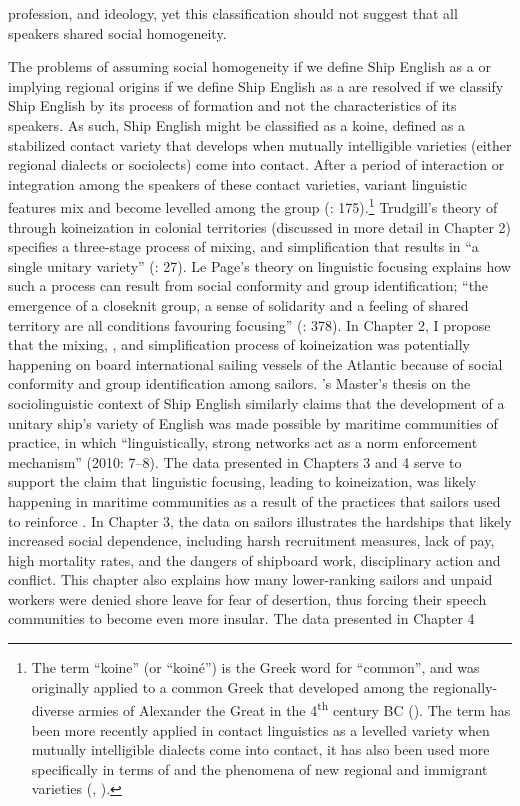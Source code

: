profession, and ideology, yet this classification should not suggest that all speakers shared social homogeneity. 

The problems of assuming social homogeneity if we define Ship English as a  or implying regional origins if we define Ship English as a  are resolved if we classify Ship English by its process of formation and not the characteristics of its speakers. As such, Ship English might be classified as a koine, defined as a stabilized contact variety that develops when mutually intelligible varieties (either regional dialects or sociolects) come into contact. After a period of interaction or integration among the speakers of these contact varieties, variant linguistic features mix and become levelled among the group (\citealt{Siegel2001}: 175).\footnote{The term “koine” (or “koiné”) is the Greek word for “common”, and was originally applied to a common Greek  that developed among the regionally-diverse armies of Alexander the Great in the 4\textsuperscript{th} century BC (\citealt{Andriotis1995}). The term has been more recently applied in contact linguistics as a levelled variety when mutually intelligible dialects come into contact, it has also been used more specifically in terms of  \citep{Siegel2001} and the phenomena of new regional and immigrant varieties (\citealt{Trudgill1986}, \citealt{Kerswill2004}).} Trudgill’s theory of  through koineization in colonial territories (discussed in more detail in Chapter 2) specifies a three-stage process of mixing,  and simplification that results in “a single unitary variety” (\citealt{Trudgill1986}: 27). Le Page’s theory on linguistic focusing explains how such a process can result from social conformity and group identification; “the emergence of a closeknit group, a sense of solidarity and a feeling of shared territory are all conditions favouring focusing” (\citealt{Milroy1986}: 378). In Chapter 2, I propose that the mixing, , and simplification process of koineization was potentially happening on board international sailing vessels of the Atlantic because of social conformity and group identification among sailors. \citeauthor{Schultz2010}’s Master’s thesis on the sociolinguistic context of Ship English similarly claims that the development of a unitary ship’s variety of English was made possible by maritime communities of practice, in which “linguistically, strong networks act as a norm enforcement mechanism” (2010: 7–8). The data presented in Chapters 3 and 4 serve to support the claim that linguistic focusing, leading to koineization, was likely happening in maritime communities as a result of the practices that sailors used to reinforce . In Chapter 3, the data on sailors illustrates the hardships that likely increased social dependence, including harsh recruitment measures, lack of pay, high mortality rates, and the dangers of shipboard work, disciplinary action and conflict. This chapter also explains how many lower-ranking sailors and unpaid workers were denied shore leave for fear of desertion, thus forcing their speech communities to become even more insular. The data presented in Chapter 4 